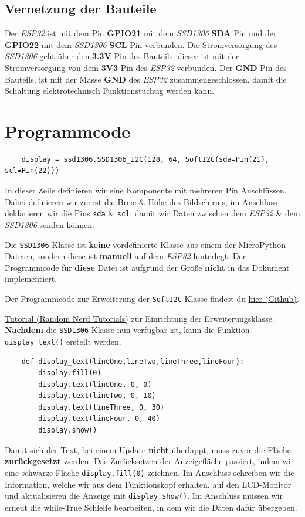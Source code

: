 \documentclass[9pt,a4paper]{report}
\begin{document}
	\subsection{Vernetzung der Bauteile}
	Der \textit{ESP32} ist mit dem Pin \textbf{GPIO21} mit dem \textit{SSD1306} \textbf{SDA} Pin und der \textbf{GPIO22} mit dem \textit{SSD1306} \textbf{SCL} Pin verbunden.
	Die Stromversorgung des \textit{SSD1306} geht über den \textbf{3.3V} Pin des Bauteils, dieser ist mit der Stromversorgung von dem \textbf{3V3} Pin des \textit{ESP32} verbunden.
	Der \textbf{GND} Pin des Bauteils, ist mit der Masse \textbf{GND} des \textit{ESP32} zusammengeschlossen, damit die Schaltung elektrotechnisch Funktionstüchtig werden kann.
	
	\section{Programmcode}
	\begin{lstlisting}
	display = ssd1306.SSD1306_I2C(128, 64, SoftI2C(sda=Pin(21), scl=Pin(22)))
	\end{lstlisting}
	In dieser Zeile definieren wir eine Komponente mit mehreren Pin Anschlüssen. Dabei definieren wir zuerst die Breie \& Höhe des Bildschirms, im Anschluss deklarieren wir die Pins \texttt{sda} \& \texttt{scl}, damit wir Daten zwischen dem \textit{ESP32} \& dem \textit{SSD1306} senden können. 
	
	Die \texttt{SSD1306} Klasse ist \textbf{keine} vordefinierte Klasse aus einem der MicroPython Dateien, sondern diese ist \textbf{manuell} auf dem \textit{ESP32} hinterlegt.
	Der Programmcode für \textbf{diese} Datei ist aufgrund der Größe \textbf{nicht} in das Dokument implementiert.
	
	Der Programmcode zur Erweiterung der \texttt{SoftI2C}-Klasse findest du \hyperref{https://raw.githubusercontent.com/RuiSantosdotme/ESP-MicroPython/master/code/Others/OLED/ssd1306.py}{}{}{hier (Github)}. 
	
	\hyperref{https://randomnerdtutorials.com/micropython-oled-display-esp32-esp8266/}{}{}{Tutorial (Random Nerd Tutorials)} zur Einrichtung der Erweiterungsklasse.
	\newline
	\newline
	\textbf{Nachdem} die \texttt{SSD1306}-Klasse nun verfügbar ist, kann die Funktion \texttt{display\_text()} erstellt werden.
	\begin{lstlisting}
	def display_text(lineOne,lineTwo,lineThree,lineFour):
		display.fill(0)
		display.text(lineOne, 0, 0)
		display.text(lineTwo, 0, 10)
		display.text(lineThree, 0, 30)
		display.text(lineFour, 0, 40)
		display.show()
	\end{lstlisting}
	Damit sich der Text, bei einem Update \textbf{nicht} überlappt, muss zuvor die Fläche \textbf{zurückgesetzt} werden. Das Zurücksetzen der Anzeigefläche passiert, indem wir eine schwarze Fläche \texttt{display.fill(0)} zeichnen. Im Anschluss schreiben wir die Information, welche wir aus dem Funktionskopf erhalten, auf den LCD-Monitor und aktualisieren die Anzeige mit \texttt{display.show()}.
	\newpage
	Im Anschluss müssen wir erneut die while-True Schleife bearbeiten, in dem wir die Daten dafür übergeben.
	
\end{document}
